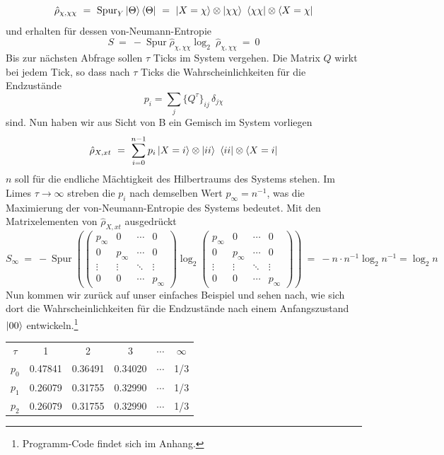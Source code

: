 \documentclass[12pt]{article}
\begin{document}
\begin{equation}
\hat{\rho}_{\chi,\chi\chi}\ =\ \operatorname{Spur}_Y \ket{\Theta}\bra{\Theta}\ =\ 
\ket{X=\chi}\otimes\ket{\chi\chi}\ \bra{\chi\chi}\otimes\bra{X=\chi} 
\end{equation}
und erhalten für dessen von-Neumann-Entropie
\begin{equation}
S\ =\ -\operatorname{Spur} \hat{\rho}_{\chi,\chi\chi} \log_2\ \hat{\rho}_{\chi,\chi\chi}\ = \ 0
\end{equation}
Bis zur nächsten Abfrage sollen $\tau$ Ticks im System vergehen. Die Matrix $Q$ wirkt bei jedem Tick, so dass nach $\tau$ Ticks die Wahrscheinlichkeiten für die Endzustände
\begin{equation}
p_i=\sum_j \{Q^\tau\}_{ij}\, \delta_{j\chi}
\end{equation}
sind. Nun haben wir aus Sicht von B ein Gemisch im System vorliegen
\begin{equation}
\hat{\rho}_{X,xt}\ = \ \sum_{i=0}^{n-1} p_i \ket{X=i}\otimes\ket{ii}\ \bra{ii}\otimes\bra{X=i} 
\end{equation}
$n$ soll für die endliche Mächtigkeit des Hilbertraums des Systems stehen. Im Limes $\tau\rightarrow\infty$ streben die $p_i$ nach demselben Wert $p_\infty=n^{-1}$, was die Maximierung der von-Neumann-Entropie des Systems bedeutet. Mit den Matrixelementen von $\hat{\rho}_{X,xt}$ ausgedrückt
\begin{equation}
S_\infty\ =\ -\operatorname{Spur} \left(
\begin{pmatrix}
p_\infty&0&\cdots &0\\
0&p_\infty&\cdots &0\\
\vdots &\vdots &\ddots &\vdots \\
0&0&\cdots &p_\infty
\end{pmatrix}
\log_2
\begin{pmatrix}
p_\infty&0&\cdots &0\\
0&p_\infty&\cdots &0\\
\vdots &\vdots &\ddots &\vdots \\
0&0&\cdots &p_\infty
\end{pmatrix} \right)
\ =\ - n \cdot n^{-1} \log_2{n^{-1}} = \log_2{n}
\end{equation}
Nun kommen wir zurück auf unser einfaches Beispiel und sehen nach, wie sich dort die Wahrscheinlichkeiten für die Endzustände nach einem Anfangszustand $\ket{00}$ entwickeln.\footnote{Programm-Code findet sich im Anhang.}
\begin{center}
\begin{tabular}{ |c|c|c|c|c|c| } 
 \hline
 $\tau$ & 1 & 2 & 3 & $\cdots$ & $\infty$ \\ 
 $p_0$ & 0.47841 & 0.36491 & 0.34020 & $\cdots$ & 1/3 \\
 $p_1$ & 0.26079 & 0.31755 & 0.32990 & $\cdots$ & 1/3 \\
 $p_2$ & 0.26079 & 0.31755 & 0.32990 & $\cdots$ & 1/3 \\
 \hline
\end{tabular}
\end{center}
\end{document}
